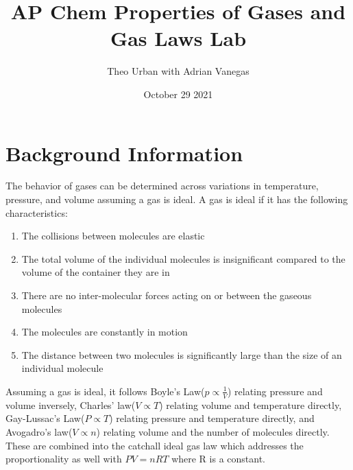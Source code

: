 \documentclass{article}
\title{AP Chem Properties of Gases and Gas Laws Lab}
\author{Theo Urban with Adrian Vanegas}
\date{October 29 2021}
\begin{document}
\maketitle

\section{Background Information}
    
    The behavior of gases can be determined across variations in temperature, pressure, and volume assuming a gas is ideal. A gas is ideal if it has the following characteristics: 
    \begin{enumerate}
        \item The collisions between molecules are elastic
        \item The total volume of the individual molecules is insignificant compared to the volume of the container they are in
        \item There are no inter-molecular forces acting on or between the gaseous molecules
        \item The molecules are constantly in motion 
        \item The distance between two molecules is significantly large than the size of an individual molecule
    \end{enumerate}
    
    Assuming a gas is ideal, it follows Boyle's Law($p\propto \frac{1}{V}$) relating pressure and volume inversely, Charles' law($V\propto T$) relating volume and temperature directly, Gay-Lussac's Law($P\propto T$) relating pressure and temperature directly, and Avogadro's law($V\propto n$) relating volume and the number of molecules directly.  These are combined into the catchall ideal gas law which addresses the proportionality as well with $PV=nRT$ where R is a constant. 
    
\end{document}
